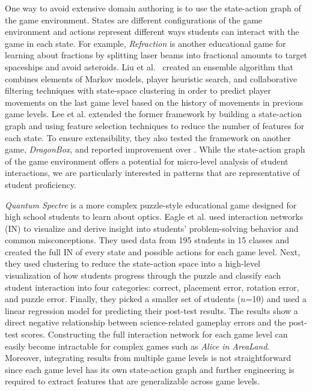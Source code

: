 \documentclass{sigchi}
\begin{document}
	One way to avoid extensive domain authoring is to use the state-action graph of the game environment. 
	States are different configurations of the game environment and actions represent different ways students can interact with the game in each state. For example, \textit {Refraction} \cite{andersen2010gameplay} is another educational game for learning about fractions by splitting laser beams into fractional amounts to target spaceships and avoid asteroids. 
	Liu et al.~\cite{liu2013predicting} created an ensemble algorithm that combines elements of Markov models, player heuristic search, and collaborative filtering techniques with state-space clustering in order to predict player movements on the last game level based on the history of movements in previous game levels. 
	Lee et al. \cite{lee2014learning} extended the former framework by building a state-action graph and using feature selection techniques to reduce the number of features for each state. 
	To ensure extensibility, they also tested the framework on another game, \textit {DragonBox}, and reported improvement over \cite{liu2013predicting}.
	While the state-action graph of the game environment offers a potential for micro-level analysis of student interactions, we are particularly interested in patterns that are representative of student proficiency.
	
	\textit {Quantum Spectre} is a more complex puzzle-style educational game designed for high school students to learn about optics. 
	Eagle et al. \cite{eagle2015measuring} used interaction networks (IN) to visualize and derive insight into students' problem-solving behavior and common misconceptions. 
	They used data from 195 students in 15 classes and created the full IN of every state and possible actions for each game level. 
	Next, they used clustering to reduce the state-action space into a high-level visualization of how students progress through the puzzle and classify each student interaction into four categories: correct, placement error, rotation error, and puzzle error. 
	Finally, they picked a smaller set of students ($n$=10) and used a linear regression model for predicting their post-test results.
	The results show a direct negative relationship between science-related gameplay errors and the post-test scores.
	Constructing the full interaction network for each game level 
	can easily become intractable for complex games such as \textit{Alice in AreaLand}. Moreover, integrating results from multiple game levels is not straightforward since each game level has its own state-action graph and further engineering is required to extract features that are generalizable across game levels. 
	
\end{document}
